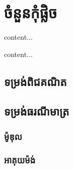 \documentclass[a5paper,10pt]{fancy}
\begin{document}
	\chapter{ចំនួនកុំផ្លិច}
	\begin{definition}
		content...
	\end{definition}
	\begin{theorem}
		content...
	\end{theorem}
	\section{ទម្រង់ពិជគណិត}
	\section{ទម្រង់ធរណីមាត្រ}
	\subsection{ម៉ូឌុល}
	\subsection{អាគុយម៉ង់}
\end{document}
